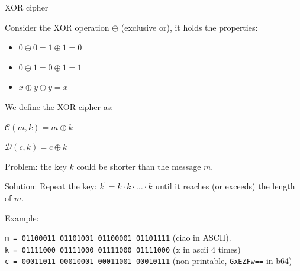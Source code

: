 \documentclass[handout, xcolor=dvipsnames,aspectratio=169]{beamer}
\begin{document}
\begin{frame}{XOR cipher}

  Consider the XOR operation $\oplus$ (exclusive or), it holds the properties:

  \begin{itemize}
    \item $0 \oplus 0 = 1 \oplus 1 = 0$
    \item $0 \oplus 1 = 0 \oplus 1 = 1$
    \item $x \oplus y \oplus y = x$
  \end{itemize}

  \medskip
  \pause

  We define the XOR cipher as:

  $\mathcal{C}(m, k) = m \oplus k$

  $\mathcal{D}(c, k) = c \oplus k$

  \medskip

  \pause

  Problem: the key $k$ could be shorter than the message $m$.

  Solution: Repeat the key: $k^{'} = k \cdot k \cdot \ldots \cdot k$ until it reaches (or exceeds) the length of $m$.

  \medskip
  \pause

  Example:

  \texttt{m = 01100011 01101001 01100001 01101111} (ciao in ASCII).\\
  \texttt{k = 01111000 01111000 01111000 01111000} (x in ascii 4 times)\\
  \texttt{c = 00011011 00010001 00011001 00010111} (non printable, \texttt{GxEZFw==} in b64)


\end{frame}
\end{document}
